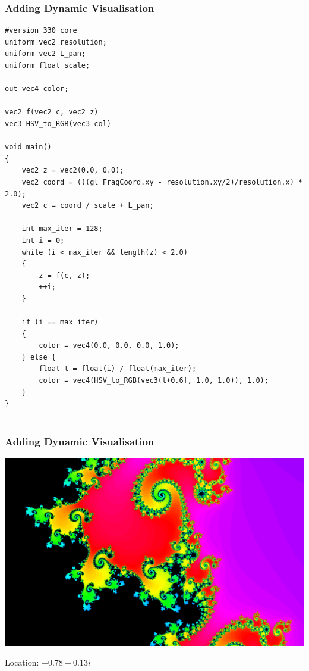 \documentclass{beamer}
\begin{document}
\begin{frame}[fragile]
\frametitle{Adding Dynamic Visualisation}

\begin{verbatim}
#version 330 core
uniform vec2 resolution;
uniform vec2 L_pan;
uniform float scale;

out vec4 color;

vec2 f(vec2 c, vec2 z)
vec3 HSV_to_RGB(vec3 col)

void main()
{
    vec2 z = vec2(0.0, 0.0);
    vec2 coord = (((gl_FragCoord.xy - resolution.xy/2)/resolution.x) * 2.0);
    vec2 c = coord / scale + L_pan;

    int max_iter = 128;
    int i = 0;
    while (i < max_iter && length(z) < 2.0)
    {
        z = f(c, z);
        ++i;
    }

    if (i == max_iter)
    {
        color = vec4(0.0, 0.0, 0.0, 1.0);
    } else {
        float t = float(i) / float(max_iter);
        color = vec4(HSV_to_RGB(vec3(t+0.6f, 1.0, 1.0)), 1.0);
    }
}


\end{verbatim}
\end{frame}


\begin{frame}
\frametitle{Adding Dynamic Visualisation}
\includegraphics[width=1.0\textwidth]{ZoomedMandelbrot.png}
\par \tiny {Location: $-0.78 + 0.13i$}
\end{frame}
\end{document}
